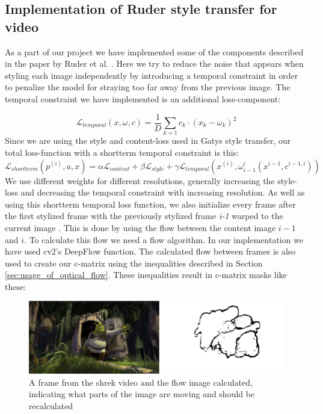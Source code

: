 \subsection{Implementation of Ruder style transfer for video}
\label{sec:Ruder style transfer}
As a part of our project we have implemented some of the components described in the paper by Ruder et al. \cite{Ruder:1}. Here we try to reduce the noise that appears when styling each image independently by introducing a temporal constraint in order to penalize the model for straying too far away from the previous image.\newline\newline
The temporal constraint we have implemented is an additional loss-component: \newline

\begin{equation}
\mathcal{L}_{temporal}(x, \omega, c) = \frac{1}{D}\sum_{k=1} c_k \cdot (x_k - \omega_k)^2
\end{equation}
Since we are using the style and content-loss used in Gatys style transfer, our total loss-function with a shortterm temporal constraint is this:\newline
\begin{equation}
\mathcal{L}_{shortterm}(p^{(i)}, a, x) = \alpha \mathcal{L}_{content} + \beta \mathcal{L}_{style} + \gamma \mathcal{L}_{temporal}(x^{(i)}, \omega_{i-1}^i(x^{i-1}, c^{i-1, i}))
\end{equation}
We use different weights for different resolutions, generally increasing the style-loss and decreasing the temporal constraint with increasing resolution.\newline
As well as using this shortterm temporal loss function, we also initialize every frame after the first stylized frame with the previously stylized frame \textit{i-1} warped to the current image . This is done by using the flow between the content image $i-1$ and $i$. 
To calculate this flow we need a flow algorithm. In our implementation we have used cv2's DeepFlow function. The calculated flow between frames is also used to create our c-matrix using the inequalities described in Section \ref{sec:usage_of_optical_flow}. These inequalities result in c-matrix masks like these:\newline 
\begin{figure}[!ht]
\begin{center}
\includegraphics[scale=0.35]{report/Method/images/shrek_flow.png}
\caption{A frame from the shrek video and the flow image calculated, indicating what parts of the image are moving and should be recalculated}
\label{fig:architecture}
\end{center}
\end{figure}
